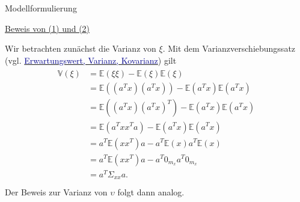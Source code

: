 \documentclass[
  8pt,
  ignorenonframetext,
]{beamer}
\begin{document}
\begin{frame}{Modellformulierung}
\protect\hypertarget{modellformulierung-1}{}
\footnotesize

\underline{Beweis von (1) und (2)}

Wir betrachten zunächst die Varianz von \(\xi\). Mit dem
Varianzverschiebungssatz (vgl.
\href{https://youtu.be/613-3a1Pyyg}{\textcolor{darkblue}{Erwartungswert, Varianz, Kovarianz}})
gilt \begin{align}
\begin{split}
\mathbb{V}(\xi)
& = \mathbb{E}\left(\xi \xi \right) - \mathbb{E}(\xi)\mathbb{E}(\xi) \\
& = \mathbb{E}\left((a^Tx) (a^Tx)\right) - \mathbb{E}\left(a^Tx\right)\mathbb{E}\left(a^Tx\right) \\
& = \mathbb{E}\left((a^Tx) (a^Tx)^T\right) - \mathbb{E}\left(a^Tx\right)\mathbb{E}\left(a^Tx\right) \\
& = \mathbb{E}\left(a^Txx^Ta\right) - \mathbb{E}\left(a^Tx\right)\mathbb{E}\left(a^Tx\right) \\
& = a^T\mathbb{E}\left(xx^T\right)a - a^T\mathbb{E}(x)a^T\mathbb{E}(x) \\
& = a^T\mathbb{E}\left(xx^T\right)a - a^T0_{m_x}a^T0_{m_x} \\
& = a^T\Sigma_{xx}a. \\
\end{split}
\end{align} Der Beweis zur Varianz von \(\upsilon\) folgt dann analog.
\end{frame}
\end{document}
